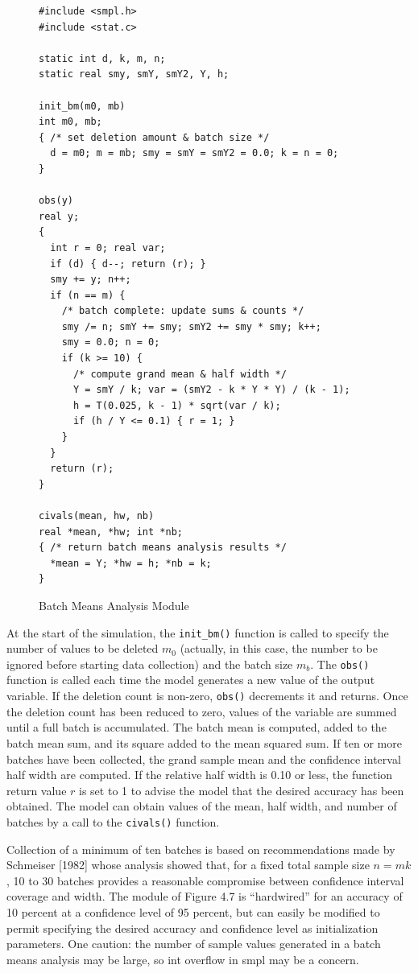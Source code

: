 \begin{figure}[ht]
\centering
\begin{verbatim}
#include <smpl.h>
#include <stat.c>

static int d, k, m, n;
static real smy, smY, smY2, Y, h;

init_bm(m0, mb)
int m0, mb;
{ /* set deletion amount & batch size */
  d = m0; m = mb; smy = smY = smY2 = 0.0; k = n = 0;
}

obs(y)
real y;
{
  int r = 0; real var;
  if (d) { d--; return (r); }
  smy += y; n++;
  if (n == m) {
    /* batch complete: update sums & counts */
    smy /= n; smY += smy; smY2 += smy * smy; k++;
    smy = 0.0; n = 0;
    if (k >= 10) {
      /* compute grand mean & half width */
      Y = smY / k; var = (smY2 - k * Y * Y) / (k - 1);
      h = T(0.025, k - 1) * sqrt(var / k);
      if (h / Y <= 0.1) { r = 1; }
    }
  }
  return (r);
}

civals(mean, hw, nb)
real *mean, *hw; int *nb;
{ /* return batch means analysis results */
  *mean = Y; *hw = h; *nb = k;
}
\end{verbatim}
\caption{Batch Means Analysis Module}
\end{figure}

At the start of the simulation, the \texttt{init\_bm()} function is called to
specify the number of values to be deleted $m_0$ (actually, in this case, the
number to be ignored before starting data collection) and the batch size $m_b$.
The \texttt{obs()} function is called each time the model generates a new value
of the output variable. If the deletion count is non-zero, \texttt{obs()}
decrements it and returns. Once the deletion count has been reduced to zero,
values of the variable are summed until a full batch is accumulated. The batch
mean is computed, added to the batch mean sum, and its square added to the mean
squared sum. If ten or more batches have been collected, the grand sample mean
and the confidence interval half width are computed. If the relative half width
is 0.10 or less, the function return value $r$ is set to 1 to advise the model
that the desired accuracy has been obtained. The model can obtain values of the
mean, half width, and number of batches by a call to the \texttt{civals()}
function.

Collection of a minimum of ten batches is based on recommendations made by
Schmeiser [1982] whose analysis showed that, for a fixed total sample size
$n = mk$, 10 to 30 batches provides a reasonable compromise between confidence
interval coverage and width. The module of Figure 4.7 is ``hardwired'' for an
accuracy of 10 percent at a confidence level of 95 percent, but can easily be
modified to permit specifying the desired accuracy and confidence level as
initialization parameters. One caution: the number of sample values generated
in a batch means analysis may be large, so int overflow in smpl may be a
concern.

